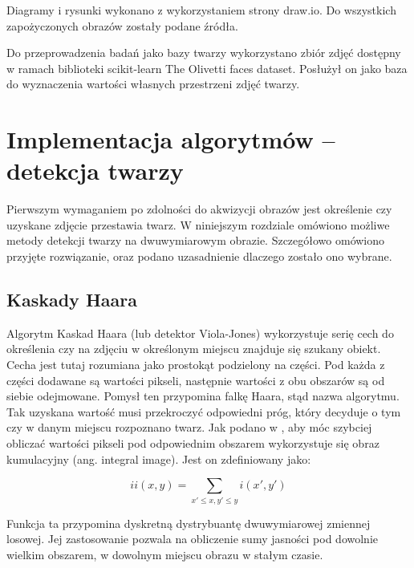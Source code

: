 \documentclass[oneside, eng]{mgr}
\begin{document}
Diagramy i rysunki wykonano z wykorzystaniem strony draw.io. Do wszystkich zapożyczonych obrazów zostały podane źródła.

Do przeprowadzenia badań jako bazy twarzy wykorzystano zbiór zdjęć dostępny w ramach biblioteki scikit-learn The Olivetti faces dataset. Posłużył on jako baza do wyznaczenia wartości własnych przestrzeni zdjęć twarzy.

\newpage

\chapter{Implementacja algorytmów – detekcja twarzy}

Pierwszym wymaganiem po zdolności do akwizycji obrazów jest określenie czy uzyskane zdjęcie przestawia twarz. W niniejszym rozdziale omówiono możliwe metody detekcji twarzy na dwuwymiarowym obrazie. Szczegółowo omówiono przyjęte rozwiązanie, oraz podano uzasadnienie dlaczego zostało ono wybrane.

\section{Kaskady Haara}
Algorytm Kaskad Haara (lub detektor Viola-Jones) wykorzystuje serię cech do określenia czy na zdjęciu w określonym miejscu znajduje się szukany obiekt. Cecha jest tutaj rozumiana jako prostokąt podzielony na części. Pod każda z części dodawane są wartości pikseli, następnie wartości z obu obszarów są od siebie odejmowane. Pomysł ten przypomina falkę Haara, stąd nazwa algorytmu. Tak uzyskana wartość musi przekroczyć odpowiedni próg, który decyduje o tym czy w danym miejscu rozpoznano twarz. Jak podano w \cite{Kaskada Haara}, aby móc szybciej obliczać wartości pikseli pod odpowiednim obszarem wykorzystuje się obraz kumulacyjny (ang. integral image). Jest on zdefiniowany jako:

\begin{equation}
	ii(x,y) = \sum_{x' \leq x, y' \leq y} i(x',y')
\end{equation}

Funkcja ta przypomina dyskretną dystrybuantę dwuwymiarowej zmiennej losowej. Jej zastosowanie pozwala na obliczenie sumy jasności pod dowolnie wielkim obszarem, w dowolnym miejscu obrazu w stałym czasie.
\end{document}
